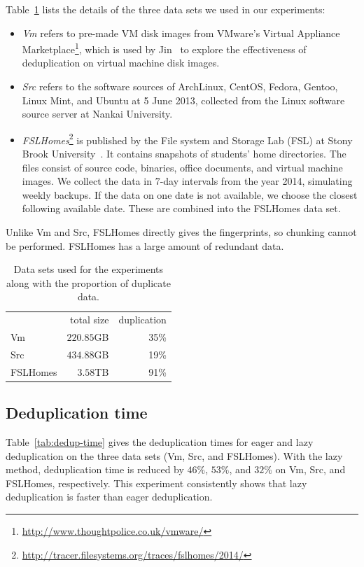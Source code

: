 \documentclass[prodmode,acmtecs]{acmsmall}
\begin{document}
Table~\ref{tab:data} lists the details of the three data sets we used in our experiments:
\begin{itemize}
 \item \textit{Vm} refers to pre-made VM disk images from VMware's Virtual Appliance Marketplace\footnote{\url{http://www.thoughtpolice.co.uk/vmware/}}, which is used by Jin~\cite{jin2009the} to explore the effectiveness of deduplication on virtual machine disk images.
 \item \textit{Src} refers to the software sources of ArchLinux, CentOS, Fedora, Gentoo, Linux Mint, and Ubuntu at 5 June 2013, collected from the Linux software source server at Nankai University.
 \item \textit{FSLHomes}\footnote{\url{http://tracer.filesystems.org/traces/fslhomes/2014/}} is published by the File system and Storage Lab (FSL) at Stony Brook University~\cite{tarasov2012generating}. It contains snapshots of students' home directories. The files consist of source code, binaries, office documents, and virtual machine images.  We collect the data in $7$-day intervals from the year 2014, simulating weekly backups. If the data on one date is not available, we choose the closest following available date.  These are combined into the FSLHomes data set.
\end{itemize}

Unlike Vm and Src, FSLHomes directly gives the fingerprints, so chunking cannot be performed. FSLHomes has a large amount of redundant data.

\begin{table}[htbp]
\centering
{
\begin{tabular}{lrr}
\toprule
 & total size & duplication \\
\cmidrule(lr){2-2}\cmidrule(lr){3-3}
Vm & $220.85$GB & 35\% \\
Src & $434.88$GB & 19\% \\
FSLHomes & $3.58$TB & 91\% \\
\bottomrule
\end{tabular}
}
\caption{Data sets used for the experiments along with the proportion of duplicate data.}
\label{tab:data}
\end{table}

\subsection{Deduplication time}

Table~\ref{tab:dedup-time} gives the deduplication times for eager and lazy deduplication on the three data sets (Vm, Src, and FSLHomes).  With the lazy method, deduplication time is reduced by $46\%$, $53\%$, and $32\%$ on Vm, Src, and FSLHomes, respectively.  This experiment consistently shows that lazy deduplication is faster than eager deduplication.
\end{document}
